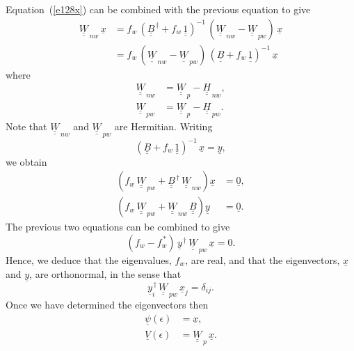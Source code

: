 \documentclass[12pt,prb,aps,notitlepage]{revtex4-1}
\begin{document}
Equation~(\ref{e128x}) can be combined with the previous equation to give
\begin{align}
\underline{\underline{W}}_{\,nw}\,\underline{x} &= f_w\,(\underline{\underline{B}}^{\,\dag}+f_w\,\underline{\underline{1}})^{-1}\,( \underline{\underline{W}}_{\,nw} - \underline{\underline{W}}_{\,pw} )\,\underline{x}\nonumber\\[0.5ex]
&=f_w\,(\underline{\underline{W}}_{\,nw} - \underline{\underline{W}}_{\,pw} )\,(\underline{\underline{B}}+f_w\,\underline{\underline{1}})^{-1}\,\underline{x}
\end{align}
where
\begin{align}
\underline{\underline{W}}_{\,nw}  &= \underline{\underline{W}}_{\,p}-\underline{\underline{H}}_{\,nw},\\[0.5ex]
\underline{\underline{W}}_{\,pw}  &= \underline{\underline{W}}_{\,p}-\underline{\underline{H}}_{\,pw}.
\end{align}
Note that $\underline{\underline{W}}_{\,nw}$ and $\underline{\underline{W}}_{\,pw}$ are Hermitian.
Writing
\begin{equation}
(\underline{\underline{B}}+f_w\,\underline{\underline{1}})^{-1} \,\underline{x}= \underline{y},
\end{equation}
we obtain
\begin{align}\label{e141}
\left(f_w\,\underline{\underline{W}}_{\,pw}
+\underline{\underline{B}}^{\,\dag}\,\underline{\underline{W}}_{\,nw}\right)\underline{x}&=\underline{0},\\[0.5ex]
\left(f_w\,\underline{\underline{W}}_{\,pw}
+\underline{\underline{W}}_{\,nw}\,\underline{\underline{B}}\right)\underline{y} &=\underline{0}.\label{e142}
\end{align}
The previous two equations can be combined to give
\begin{equation}
(f_w-f_w^{\,\ast})\,\underline{y}^{\,\dag}\,\underline{\underline{W}}_{\,pw}\,\underline{x} = 0.
\end{equation}
Hence, we deduce that the eigenvalues, $f_w$,  are real, and that the eigenvectors, $\underline{x}$ and $\underline{y}$,  are orthonormal, in the sense that
\begin{equation}
\underline{y}_i^{\,\dag}\,
\underline{\underline{W}}_{\,pw}\,\underline{x}_j= \delta_{ij}.
\end{equation} 
Once we have determined the eigenvectors then
\begin{align}
\underline{\psi}(\epsilon) &=\underline{x},\\[0.5ex]
\underline{V}(\epsilon) &= \underline{\underline{W}}_{\,p} \,\underline{x}.
\end{align}
\end{document}
